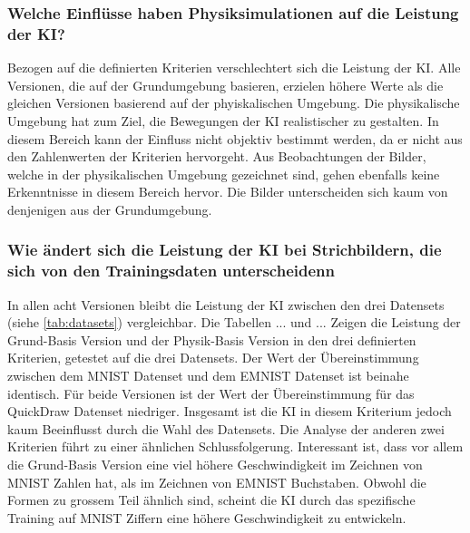 \subsubsection*{Welche Einflüsse haben Physiksimulationen auf die Leistung der KI?}
Bezogen auf die definierten Kriterien verschlechtert sich die Leistung der KI.
Alle Versionen, die auf der Grundumgebung basieren, erzielen höhere Werte als
die gleichen Versionen basierend auf der phyiskalischen Umgebung. Die
physikalische Umgebung hat zum Ziel, die Bewegungen der KI realistischer zu
gestalten. In diesem Bereich kann der Einfluss nicht objektiv bestimmt werden,
da er nicht aus den Zahlenwerten der Kriterien hervorgeht. Aus Beobachtungen der
Bilder, welche in der physikalischen Umgebung gezeichnet sind, gehen ebenfalls
keine Erkenntnisse in diesem Bereich hervor. Die Bilder unterscheiden sich kaum
von denjenigen aus der Grundumgebung.

\subsubsection*{Wie ändert sich die Leistung der KI bei Strichbildern, die sich von den Trainingsdaten unterscheidenn}
In allen acht Versionen bleibt die Leistung der KI zwischen den drei Datensets
(siehe \autoref{tab:datasets}) vergleichbar. Die Tabellen {...} und {...} Zeigen
die Leistung der Grund-Basis Version und der Physik-Basis Version in den drei
definierten Kriterien, getestet auf die drei Datensets. Der Wert der
Übereinstimmung zwischen dem MNIST Datenset und dem EMNIST Datenset ist beinahe
identisch. Für beide Versionen ist der Wert der Übereinstimmung für das
QuickDraw Datenset niedriger. Insgesamt ist die KI in diesem Kriterium jedoch
kaum Beeinflusst durch die Wahl des Datensets. Die Analyse der anderen zwei
Kriterien führt zu einer ähnlichen Schlussfolgerung. Interessant ist, dass vor
allem die Grund-Basis Version eine viel höhere Geschwindigkeit im Zeichnen von
MNIST Zahlen hat, als im Zeichnen von EMNIST Buchstaben. Obwohl die Formen zu
grossem Teil ähnlich sind, scheint die KI durch das spezifische Training auf
MNIST Ziffern eine höhere Geschwindigkeit zu entwickeln. 



